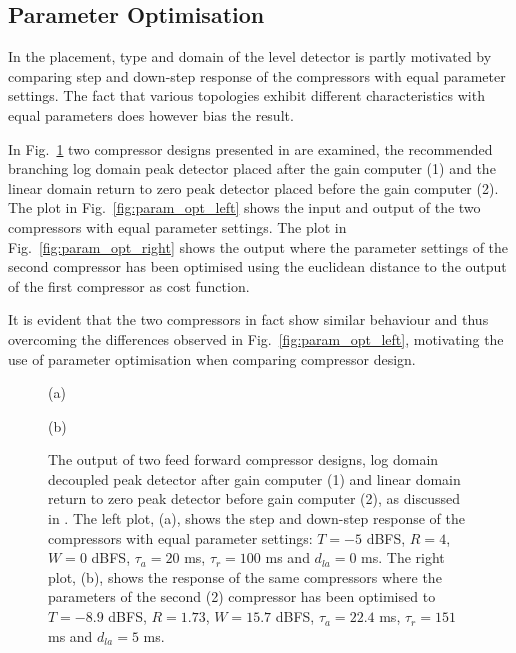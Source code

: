 \documentclass[../main2.tex]{subfiles}
\providecommand{\rootdir}{..}
\begin{document}
\subsection{Parameter Optimisation}
In \cite{reiss2012tutorial} the placement, type and domain of the level detector is partly motivated by comparing step and down-step response of the compressors with equal parameter settings. The fact that various topologies exhibit different characteristics with equal parameters does however bias the result. 

In Fig.~\ref{fig:param_opt} two compressor designs presented in \cite{reiss2012} are examined, the recommended branching log domain peak detector placed after the gain computer (1) and the linear domain return to zero peak detector placed before the gain computer (2). The plot in Fig.~\ref{fig:param_opt_left} shows the input and output of the two compressors with equal parameter settings. The plot in Fig.~\ref{fig:param_opt_right} shows the output where the parameter settings of the second compressor has been optimised using the euclidean distance to the output of the first compressor as cost function. 

It is evident that the two compressors in fact show similar behaviour and thus overcoming the differences observed in Fig.~\ref{fig:param_opt_left}, motivating the use of parameter optimisation when comparing compressor design.
\begin{figure}[ht]
\captionsetup*{justification=centering}
\begin{minipage}[t]{.5\textwidth}
 \centering

\caption*{(a)} 
\label{fig:param_opt_left}
\end{minipage}%
\begin{minipage}[t]{.5\textwidth}
\centering

\caption*{(b)} 
\label{fig:param_opt_right}
\end{minipage}
\caption{The output of two feed forward compressor designs, log domain decoupled peak detector after gain computer (1) and linear domain return to zero peak detector before gain computer (2), as discussed in \cite{reiss2012tutorial}. The left plot, (a), shows the step and down-step response of the compressors with equal parameter settings: $T = -5$ dBFS, $R=4$, $W=0$ dBFS, $\tau_a = 20$ ms, $\tau_r = 100$ ms and $d_{la}=0$ ms. The right plot, (b), shows the response of the same compressors where the parameters of the second (2) compressor has been optimised to $T = -8.9$ dBFS, $R=1.73$, $W=15.7$ dBFS, $\tau_a = 22.4$ ms, $\tau_r = 151$ ms and $d_{la}=5$ ms.}
\label{fig:param_opt}
\end{figure}
\end{document}
